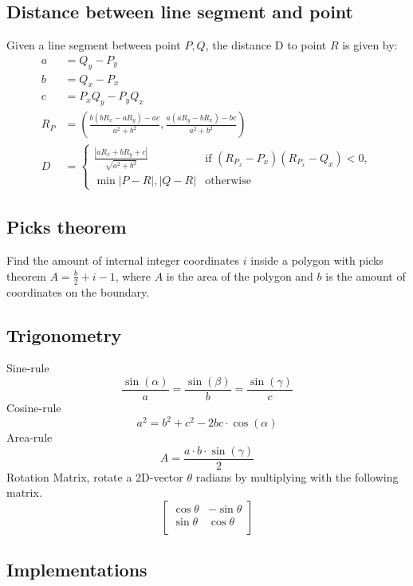 \documentclass[8pt,a4paper,landscape,oneside]{amsart}
\newcommand{\codep}[1]{\inputminted[fontsize=\large,tabsize=2,baselinestretch=1]{py}{code/#1}}
\begin{document}
\begin{multicols*}{2}
\begin{large}
        \subsection{Distance between line segment and point}
        Given a line segment between point $P, Q$, the distance D to point $R$ is given by:
        \begin{align*}
            a &= Q_y - P_y \\
            b &= Q_x - P_x \\
            c &= P_xQ_y - P_yQ_x \\
            R_P &= (\frac{b(bR_x - aR_y) - ac}{a^2 + b^2}, \frac{a(aR_y - bR_x) - bc}{a^2 + b^2}) \\
            D &= 
            \begin{cases}
                \frac{|aR_x + bR_y + c|}{\sqrt{a^2 + b^2}} & \text{if $(R_{P_x}- P_x)(R_{P_x} - Q_x) < 0$}, \\
                \min{|P - R|, |Q - R|} & \text{otherwise}
            \end{cases}
        \end{align*}
    \subsection{Picks theorem}
        Find the amount of internal integer coordinates $i$ inside a polygon with picks theorem
        $A = \frac{b}{2} + i - 1$, where $A$ is the area of the polygon and 
        $b$ is the amount of coordinates on the boundary.

    \subsection{Trigonometry}
        Sine-rule $$\frac{\sin(\alpha)}{a} = \frac{\sin(\beta)}{b} = \frac{\sin(\gamma)}{c}$$
        Cosine-rule $$a^2 = b^2 + c^2 - 2bc\cdot \cos(\alpha)$$
        Area-rule $$A = \frac{a\cdot b \cdot \sin(\gamma)}{2}$$
        Rotation Matrix, rotate a 2D-vector $\theta$ radians by multiplying with the following matrix.
        \[
          \begin{bmatrix}
            \cos \theta & -\sin \theta \\
            \sin \theta & \cos \theta \\
          \end{bmatrix}
        \]

    \subsection{Implementations}
        \codep{Geometry/geometry.py}
\newpage

\end{large}
\end{multicols*}
\end{document}
